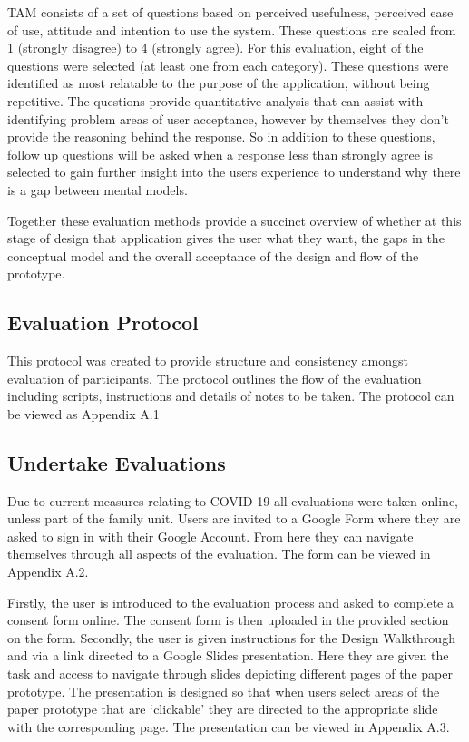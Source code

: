 \documentclass[a4 paper, 12pt]{article}
\begin{document}
TAM consists of a set of questions based on perceived usefulness, perceived ease of use, attitude and intention to use the system. These questions are scaled from 1 (strongly disagree) to 4 (strongly agree). For this evaluation, eight of the questions were selected (at least one from each category). These questions were identified as most relatable to the purpose of the application, without being repetitive. The questions provide quantitative analysis that can assist with identifying problem areas of user acceptance, however by themselves they don't provide the reasoning behind the response. So in addition to these questions, follow up questions will be asked when a response less than strongly agree is selected to gain further insight into the users experience to understand why there is a gap between mental models.

Together these evaluation methods provide a succinct overview of whether at this stage of design that application gives the user what they want, the gaps in the conceptual model and the overall acceptance of the design and flow of the prototype.


\subsection{Evaluation Protocol}
This protocol was created to provide structure and consistency amongst evaluation of participants. The protocol outlines the flow of the evaluation including scripts, instructions and details of notes to be taken. The protocol can be viewed as Appendix A.1

\subsection{Undertake Evaluations}
Due to current measures relating to COVID-19 all evaluations were taken online, unless part of the family unit. Users are invited to a Google Form where they are asked to sign in with their Google Account. From here they can navigate themselves through all aspects of the evaluation. The form can be viewed in Appendix A.2.  

Firstly, the user is introduced to the evaluation process and asked to complete a consent form online. The consent form is then uploaded in the provided section on the form. Secondly, the user is given instructions for the Design Walkthrough and via a link directed to a Google Slides presentation. Here they are given the task and access to navigate through slides depicting different pages of the paper prototype. The presentation is designed so that when users select areas of the paper prototype that are ‘clickable’ they are directed to the appropriate slide with the corresponding page. The presentation can be viewed in Appendix A.3.
\end{document}
